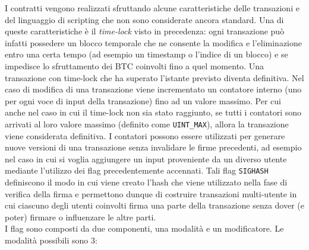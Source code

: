 I contratti vengono realizzati sfruttando alcune caratteristiche delle transazioni e del linguaggio di scripting che non sono considerate ancora standard.
Una di queste caratteristiche è il \emph{time-lock} visto in precedenza: ogni transazione può infatti possedere un blocco temporale che ne consente la modifica e l'eliminazione entro una certa tempo (ad esempio un timestamp o l'indice di un blocco) e se impedisce lo sfruttamento dei BTC coinvolti fino a quel momento. Una transazione con time-lock che ha superato l'istante previsto diventa definitiva.
Nel caso di modifica di una transazione viene incrementato un contatore interno (uno per ogni voce di input della transazione) fino ad un valore massimo. Per cui anche nel caso in cui il time-lock non sia stato raggiunto, se tutti i contatori sono arrivati al loro valore massimo (definito come \verb|UINT_MAX|), allora la transazione viene considerata definitiva. I contatori possono essere utilizzati per generare nuove versioni di una transazione senza invalidare le firme precedenti, ad esempio nel caso in cui si voglia aggiungere un input proveniente da un diverso utente mediante l'utilizzo dei flag precedentemente accennati. Tali flag \verb|SIGHASH| definiscono il modo in cui viene creato l'hash che viene utilizzato nella fase di verifica della firma e permettono dunque di costruire transazioni multi-utente in cui ciascuno degli utenti coinvolti firma una parte della transazione senza dover (e poter) firmare o influenzare le altre parti.\\
I flag sono composti da due componenti, una modalità e un modificatore. Le modalità possibili sono 3:
